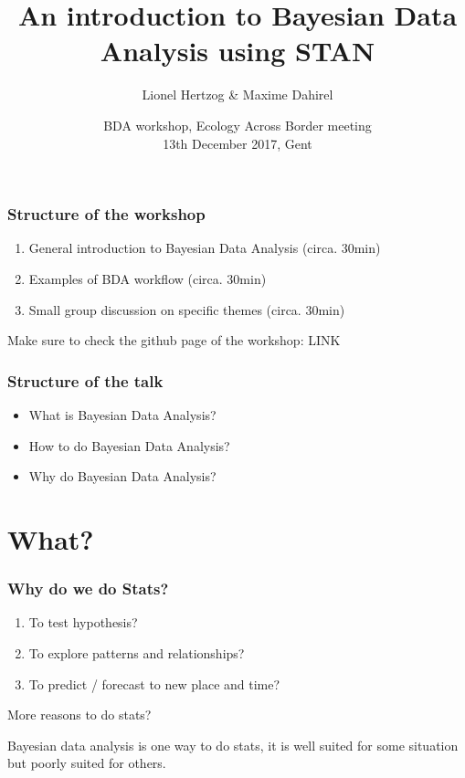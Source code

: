 \documentclass{beamer}
\title{An introduction to Bayesian Data Analysis using STAN}
\subtitle{}
\author{Lionel Hertzog \& Maxime Dahirel}
\date{BDA workshop, Ecology Across Border meeting\\ 13th December 2017, Gent}
\begin{document}
 
 \frame{\titlepage}
 

\begin{frame}
 \frametitle{\bf Structure of the workshop}
  \begin{enumerate}
   \item General introduction to Bayesian Data Analysis (circa. 30min)
   \item Examples of BDA workflow (circa. 30min)
   \item Small group discussion on specific themes (circa. 30min)
  \end{enumerate}
  
  Make sure to check the github page of the workshop: LINK

 
 \end{frame}
 
\begin{frame}
 \frametitle{\bf Structure of the talk}
  \begin{itemize}
   \item What is Bayesian Data Analysis?
   \item How to do Bayesian Data Analysis?
   \item Why do Bayesian Data Analysis?
  \end{itemize}

 
 \end{frame} 
 
 
\section*{What?} 
 
 \begin{frame}
  \frametitle{\bf Why do we do Stats?}

  \begin{enumerate}
   \item To test hypothesis?
   \item To explore patterns and relationships?
   \item To predict / forecast to new place and time?
  \end{enumerate}

  \vspace*{0.5cm}

  More reasons to do stats?
  
  \vspace*{0.2cm}
  
  Bayesian data analysis is one way to do stats, it is well suited for some situation but poorly suited for others.
  
  
  
  
 \end{frame}
\end{document}
